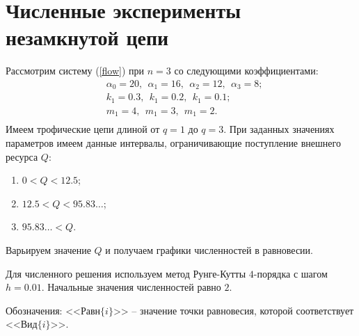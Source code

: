 \section{Численные эксперименты незамкнутой цепи}
    Рассмотрим систему (\ref{flow}) при \(n=3\) со следующими коэффициентами:
    \begin{equation*}
        \begin{split}
            & \alpha_0 = 20, ~~ \alpha_1 = 16, ~~ \alpha_2 = 12, ~~ \alpha_3 = 8; \\
            & k_1 = 0.3, ~~ k_1 = 0.2, ~~ k_1 = 0.1; \\
            & m_1 = 4, ~~ m_1 = 3, ~~ m_1 = 2. \\ 
        \end{split}
    \end{equation*}
    Имеем трофические цепи длиной от \(q=1\) до \(q=3\). При заданных значениях параметров имеем данные интервалы, ограничивающие поступление внешнего ресурса \(Q\):
    \begin{enumerate}
        \item \(0 < Q < 12.5\);
        \item \(12.5 < Q < 95.83\dots\);
        \item \( 95.83\ldots < Q\).
    \end{enumerate}
    Варьируем значение \(Q\) и получаем графики численностей в равновесии.

    Для численного решения используем метод Рунге-Кутты \(4\)-порядка с шагом \(h = 0.01\). Начальные значения численностей равно \(2\). 
    
    Обозначения: <<Равн\(\{i\}\)>> -- значение точки равновесия, которой соответствует <<Вид\(\{i\}\)>>.

